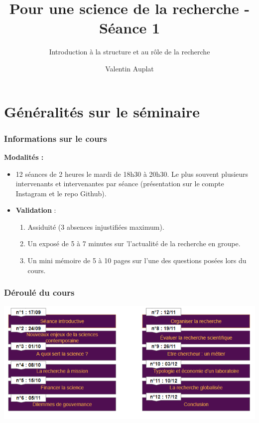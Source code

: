 \documentclass[xcolor=dvipsnames]{beamer}
\title{Pour une science de la recherche - Séance 1}
\subtitle{Introduction à la structure et au rôle de la recherche}
\author{Valentin Auplat}
\date{}
\begin{document}
	\begin{frame}
		\titlepage
	\end{frame}
	\section{Généralités sur le séminaire}
	
	\begin{frame}
		\frametitle{Informations sur le cours}
		\textbf{Modalités :}
		\begin{itemize}
			\item 12 séances de 2 heures le mardi de 18h30 à 20h30. Le plus souvent plusieurs intervenants et intervenantes par séance (présentation sur le compte Instagram et le repo Github).
			\item \textbf{Validation} :
			\begin{enumerate}
				\item Assiduité (3 absences injustifiées maximum).
				\item Un exposé de 5 à 7 minutes sur 'l'actualité de la recherche en groupe.
				\item Un mini mémoire de 5 à 10 pages sur l'une des questions posées lors du cours.
			\end{enumerate}
		\end{itemize}
	\end{frame}
	
	\begin{frame}
		\frametitle{Déroulé du cours}
		\centering
		\includegraphics[scale=1]{Séances.PNG}
	\end{frame}
	
\end{document}
